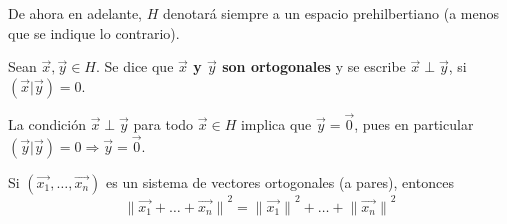 \documentclass[12pt]{report}
\theoremstyle{largebreak}
\newcommand\norm[1]{\ensuremath{\|#1\|}}
\newcommand\pint[2]{\ensuremath{\left(#1\big| #2\right)}}
\begin{document}
    De ahora en adelante, $H$ denotará siempre a un espacio prehilbertiano (a menos que se indique lo contrario).

    \begin{mydef}
        Sean $\vec{x},\vec{y}\in H$. Se dice que \textbf{$\vec{x}$ y $\vec{y}$ son ortogonales} y se escribe $\vec{x}\perp\vec{y}$, si $\pint{\vec{x}}{\vec{y}}=0$.
    \end{mydef}

    \begin{obs}
        La condición $\vec{x}\perp\vec{y}$ para todo $\vec{x}\in H$ implica que $\vec{y}=\vec{0}$, pues en particular $\pint{\vec{y}}{\vec{y}}=0\Rightarrow\vec{y}=\vec{0}$.
    \end{obs}

    \begin{theor}
        Si $\left(\vec{x_1},\dots,\vec{x_n} \right)$ es un sistema de vectores ortogonales (a pares), entonces
        \begin{equation*}
            \norm{\vec{x_1}+\dots+\vec{x_n}}^2=\norm{\vec{x_1}}^2+\dots+\norm{\vec{x_n}}^2
        \end{equation*}
    \end{theor}
\end{document}
